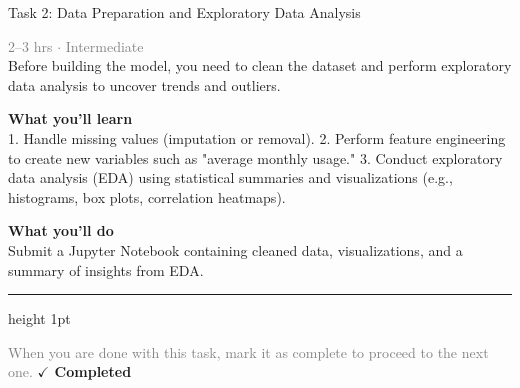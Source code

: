 \documentclass[10pt,a4paper]{article}
\begin{document}
\begin{taskbox}{Task 2: Data Preparation and Exploratory Data Analysis}

    {\small \textcolor{gray}{2--3 hrs $\cdot$ Intermediate}}\\[12pt]

      
Before building the model, you need to clean the dataset and perform exploratory data analysis to uncover trends and outliers.


\vspace{8pt}
{\large \textbf{\textcolor{brandLight}{What you'll learn}}}\\[4pt]  
1. Handle missing values (imputation or removal).  
2. Perform feature engineering to create new variables such as "average monthly usage."  
3. Conduct exploratory data analysis (EDA) using statistical summaries and visualizations (e.g., histograms, box plots, correlation heatmaps).  

\vspace{8pt}
{\large \textbf{\textcolor{brandLight}{What you'll do}}}\\[4pt]  
Submit a Jupyter Notebook containing cleaned data, visualizations, and a summary of insights from EDA.\par

    \vspace{16pt}

    \textcolor{cardBorder}{\hrule height 1pt}\vspace{8pt}

    \small \textcolor{gray}{When you are done with this task, mark it as complete to proceed to the next one.} \hfill \textbf{\textcolor{brandDark}{$\checkmark$ Completed}}

\end{taskbox}
\end{document}
